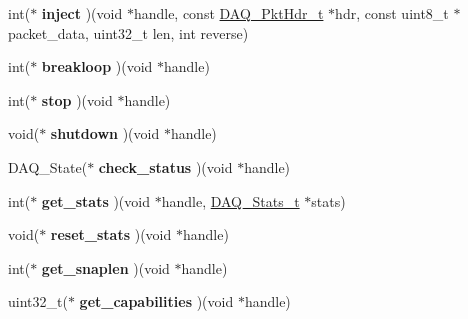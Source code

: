 \begin{DoxyCompactItemize}
\item 
\hypertarget{struct__daq__module_a87939baf4c49398b271c0a6d60e49d37}{
int($\ast$ {\bfseries inject} )(void $\ast$handle, const \hyperlink{struct__daq__pkthdr}{DAQ\_\-PktHdr\_\-t} $\ast$hdr, const uint8\_\-t $\ast$packet\_\-data, uint32\_\-t len, int reverse)}
\label{struct__daq__module_a87939baf4c49398b271c0a6d60e49d37}

\item 
\hypertarget{struct__daq__module_a8332c43f7a596ad82a9fee36ad66f2b2}{
int($\ast$ {\bfseries breakloop} )(void $\ast$handle)}
\label{struct__daq__module_a8332c43f7a596ad82a9fee36ad66f2b2}

\item 
\hypertarget{struct__daq__module_a6d39c6fdd09507757230feb97cb6ea6a}{
int($\ast$ {\bfseries stop} )(void $\ast$handle)}
\label{struct__daq__module_a6d39c6fdd09507757230feb97cb6ea6a}

\item 
\hypertarget{struct__daq__module_af8062fe057dff9fd66f29bd4f91c25da}{
void($\ast$ {\bfseries shutdown} )(void $\ast$handle)}
\label{struct__daq__module_af8062fe057dff9fd66f29bd4f91c25da}

\item 
\hypertarget{struct__daq__module_ae43518ec696834c5969ddc00aed7ac3d}{
DAQ\_\-State($\ast$ {\bfseries check\_\-status} )(void $\ast$handle)}
\label{struct__daq__module_ae43518ec696834c5969ddc00aed7ac3d}

\item 
\hypertarget{struct__daq__module_a9497d977f4bd3ff89c07bcb3118aba66}{
int($\ast$ {\bfseries get\_\-stats} )(void $\ast$handle, \hyperlink{struct__daq__stats}{DAQ\_\-Stats\_\-t} $\ast$stats)}
\label{struct__daq__module_a9497d977f4bd3ff89c07bcb3118aba66}

\item 
\hypertarget{struct__daq__module_a7d2187513072de31dbc42b2a3508cbc2}{
void($\ast$ {\bfseries reset\_\-stats} )(void $\ast$handle)}
\label{struct__daq__module_a7d2187513072de31dbc42b2a3508cbc2}

\item 
\hypertarget{struct__daq__module_a0ed3dc239fab790d9e65bac527237c75}{
int($\ast$ {\bfseries get\_\-snaplen} )(void $\ast$handle)}
\label{struct__daq__module_a0ed3dc239fab790d9e65bac527237c75}

\item 
\hypertarget{struct__daq__module_ab78d8084f450d654c233dc00c89e3c20}{
uint32\_\-t($\ast$ {\bfseries get\_\-capabilities} )(void $\ast$handle)}
\label{struct__daq__module_ab78d8084f450d654c233dc00c89e3c20}


\end{DoxyCompactItemize}
